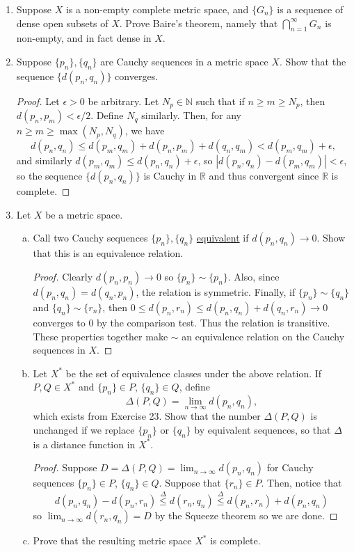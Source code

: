 \documentclass{scrbook}
\newcommand{\N}{\mathbb{N}}
\newcommand{\R}{\mathbb{R}}
\renewcommand{\to}{\rightarrow}
\renewcommand{\underline}{\ul}
\begin{document}
\begin{enumerate}
\item %
Suppose $X$ is a non-empty complete metric space, and $\{G_n\}$ is a sequence of dense open subsets of $X$. Prove Baire's theorem, namely that $\bigcap_{n=1}^{\infty} G_n$ is non-empty, and in fact dense in $X$.

\item %
Suppose $\{p_n\}, \{q_n\}$ are Cauchy sequences in a metric space $X$. Show that the sequence $\{d(p_n, q_n)\}$ converges.

\begin{proof}
    Let $\epsilon > 0$ be arbitrary. Let $N_p \in \N$ such that if $n \ge m \ge N_p$, then $d(p_n, p_m) < \epsilon / 2$. Define $N_q$ similarly. Then, for any $n \ge m \ge \max(N_p, N_q)$, we have
    \[
        d(p_n, q_n) \le d(p_m, q_m) + d(p_n, p_m) + d(q_n, q_m) < d(p_m, q_m) + \epsilon,
    \]
    and similarly $d(p_m, q_m) \le d(p_n, q_n) + \epsilon$, so $|d(p_n, q_n) - d(p_m, q_m)| < \epsilon$, so the sequence $\{d(p_n, q_n)\}$ is Cauchy in $\R$ and thus convergent since $\R$ is complete. 
\end{proof}

\item %
Let $X$ be a metric space.
\begin{enumerate}[(a)]
\item Call two Cauchy sequences $\{p_n\}, \{q_n\}$ \underline{equivalent} if $d(p_n, q_n) \to 0$. Show that this is an equivalence relation.

\begin{proof}
    Clearly $d(p_n, p_n) \to 0$ so $\{p_n\} \sim \{p_n\}$. Also, since $d(p_n, q_n) = d(q_n, p_n)$, the relation is symmetric. Finally, if $\{p_n\} \sim \{q_n\}$ and $\{q_n\} \sim \{r_n\}$, then $0 \le d(p_n, r_n) \le d(p_n, q_n) + d(q_n, r_n) \to 0$ converges to 0 by the comparison test. Thus the relation is transitive. These properties together make $\sim$ an equivalence relation on the Cauchy sequences in $X$.
\end{proof}

\item Let $X^*$ be the set of equivalence classes under the above relation. If $P, Q \in X^*$ and $\{p_n\} \in P$, $\{q_n\} \in Q$, define
\[
	\Delta(P, Q) = \lim_{n \to \infty} d(p_n, q_n),
\]
which exists from Exercise 23. Show that the number $\Delta(P, Q)$ is unchanged if we replace $\{p_n\}$ or $\{q_n\}$ by equivalent sequences, so that $\Delta$ is a distance function in $X^*$.

\begin{proof}
    Suppose $D = \Delta(P, Q) = \lim_{n \to \infty} d(p_n, q_n)$ for Cauchy sequences $\{p_n\} \in P$, $\{q_n\} \in Q$. Suppose that $\{r_n\} \in P$. Then, notice that
    \[  
        d(p_n, q_n) - d(p_n, r_n) \overset{\Delta}{\le} d(r_n, q_n) \overset{\Delta}{\le} d(p_n, r_n) + d(p_n, q_n)
    \]
    so $\lim_{n \to \infty} d(r_n, q_n) = D$ by the Squeeze theorem so we are done.
\end{proof}
\item Prove that the resulting metric space $X^*$ is complete.


\end{enumerate}
\end{enumerate}
\end{document}
